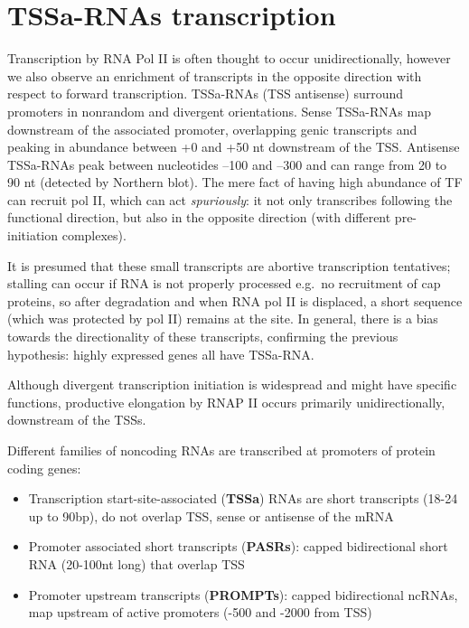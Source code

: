 \hypertarget{tssa-rnas-transcription}{%
\section{TSSa-RNAs transcription}\label{tssa-rnas-transcription}}

Transcription by RNA Pol II is often thought to occur unidirectionally, however we also observe an enrichment of transcripts in the opposite direction with respect to forward transcription. TSSa-RNAs (TSS antisense) surround promoters in nonrandom and divergent orientations. Sense TSSa-RNAs map downstream of the associated promoter, overlapping genic transcripts and peaking in abundance between +0 and +50 nt downstream of the TSS. Antisense TSSa-RNAs peak between nucleotides --100 and --300 and can range from 20 to 90 nt (detected by Northern blot). The mere fact of having high abundance of TF can recruit pol II, which can act \emph{spuriously}: it not only transcribes following the functional direction, but also in the opposite direction (with different pre-initiation complexes).

It is presumed that these small transcripts are abortive transcription tentatives; stalling can occur if RNA is not properly processed e.g.~no recruitment of cap proteins, so after degradation and when RNA pol II is displaced, a short sequence (which was protected by pol II) remains at the site. In general, there is a bias towards the directionality of these transcripts, confirming the previous hypothesis: highly expressed genes all have TSSa-RNA.

Although divergent transcription initiation is widespread and might have specific functions, productive elongation by RNAP II occurs primarily unidirectionally, downstream of the TSSs. 

Different families of noncoding RNAs are transcribed at promoters of protein coding genes:

\begin{itemize}
\tightlist
\item
  Transcription start-site-associated (\textbf{TSSa}) RNAs are short transcripts (18-24 up to 90bp), do not overlap TSS, sense or antisense of the mRNA
\item
  Promoter associated short transcripts (\textbf{PASRs}): capped bidirectional short RNA (20-100nt long) that overlap TSS
\item
  Promoter upstream transcripts (\textbf{PROMPTs}): capped bidirectional ncRNAs, map upstream of active promoters (-500 and -2000 from TSS)
\end{itemize}

